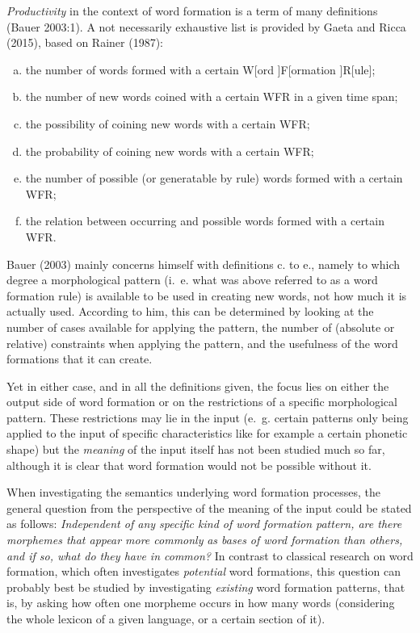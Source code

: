 \documentclass[
  english,
  a4paper,
  oneside,tablecaptionabove
]{scrbook}
\begin{document}
\emph{Productivity} in the context of word formation is a term of many
definitions (Bauer 2003:1). A not necessarily exhaustive list is
provided by Gaeta and Ricca (2015), based on Rainer (1987):

\begin{enumerate}[a.] %
\item the number of words formed with a certain W{[}ord {]}F{[}ormation
{]}R{[}ule{]};
\item the number of new words coined with a certain WFR in a given time
span;
\item the possibility of coining new words with a certain WFR;
\item the probability of coining new words with a certain WFR;
\item the number of possible (or generatable by rule) words formed with
a certain WFR;
\item the relation between occurring and possible words formed with a
certain WFR.
\end{enumerate}

Bauer (2003) mainly concerns himself with definitions c. to e., namely
to which degree a morphological pattern (i.~e. what was above referred
to as a word formation rule) is available to be used in creating new
words, not how much it is actually used. According to him, this can be
determined by looking at the number of cases available for applying the
pattern, the number of (absolute or relative) constraints when applying
the pattern, and the usefulness of the word formations that it can
create.

Yet in either case, and in all the definitions given, the focus lies on
either the output side of word formation or on the restrictions of a
specific morphological pattern. These restrictions may lie in the input
(e.~g. certain patterns only being applied to the input of specific
characteristics like for example a certain phonetic shape) but the
\emph{meaning} of the input itself has not been studied much so far,
although it is clear that word formation would not be possible without
it.

When investigating the semantics underlying word formation processes,
the general question from the perspective of the meaning of the input
could be stated as follows: \emph{Independent of any specific kind of
word formation pattern, are there morphemes that appear more commonly}
\emph{as bases of word formation than others, and if so, what do they
have in common?} In contrast to classical research on word formation,
which often investigates \emph{potential} word formations, this question
can probably best be studied by investigating \emph{existing} word
formation patterns, that is, by asking how often one morpheme occurs in
how many words (considering the whole lexicon of a given language, or a
certain section of it).
\end{document}
